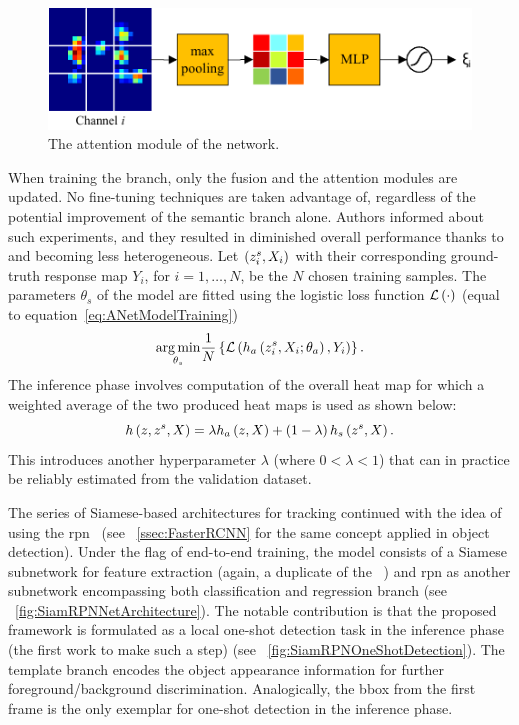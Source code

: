 \begin{figure}[t]
    \centerline{\includegraphics[width=0.6\linewidth]{figures/theoretical_foundations/twofold_siamese_net_attention_module.pdf}}
    \caption[\snet{} attention module]{The attention module of the \snet{} network. }
    \label{fig:TwofoldSiameseNetAttentionModule}
\end{figure}

When training the \snet{} branch, only the fusion and the attention modules are updated. No fine-tuning techniques are taken advantage of, regardless of the potential improvement of the semantic branch alone. Authors informed about such experiments, and they resulted in diminished overall performance thanks to \anet{} and \snet{} becoming less heterogeneous. Let $\left( {{z}_{i}^{s}, X_i} \right)$ with their corresponding ground-truth response map $Y_i$, for $i = 1, \dots, N$, be the $N$ chosen training samples. The parameters $\theta_s$ of the \snet{} model are fitted using the logistic loss function ${\mathcal{L}} \left( \cdot \right)$ (equal to equation~\ref{eq:ANetModelTraining})
\begin{equation}
    \label{eq:SNetModelTraining}
    \underset{\theta_s}{\operatorname*{arg\,min}}
    \frac{1}{N}
    \left\{ {
        {\mathcal{L}} \left( 
            {h_a} \left( {z}_{i}^{s}, X_i; \theta_a \right),
            Y_i
         \right)
    } \right\}.
\end{equation}
The inference phase involves computation of the overall heat map for which a weighted average of the two produced heat maps is used as shown below:
\begin{equation}
    {h} \left( z, z^s, X \right) = \lambda {h_a} \left( z, X \right) + \left( {1 - \lambda} \right) {h_s} \left( z^s, X \right).
\end{equation}
This introduces another hyperparameter $\lambda$ (where $0 < \lambda < 1$) that can in practice be reliably estimated from the validation dataset.

The series of Siamese-based architectures for tracking continued with the idea of using the \gls{rpn}~\cite{li2018siamrpn} (see \sectionstr{}~\ref{ssec:FasterRCNN} for the same concept applied in object detection). Under the flag of end-to-end training, the \siamrpn{} model consists of a Siamese subnetwork for feature extraction (again, a duplicate of the \siamfc{}~\cite{bertinetto2016siamfc}) and \gls{rpn} as another subnetwork encompassing both classification and regression branch (see \figstr{}~\ref{fig:SiamRPNNetArchitecture}). The notable contribution is that the proposed framework is formulated as a local one-shot detection task in the inference phase (the first work to make such a step) (see \figstr{}~\ref{fig:SiamRPNOneShotDetection}). The template branch encodes the object appearance information for further foreground/background discrimination. Analogically, the \gls{bbox} from the first frame is the only exemplar for one-shot detection in the inference phase.

